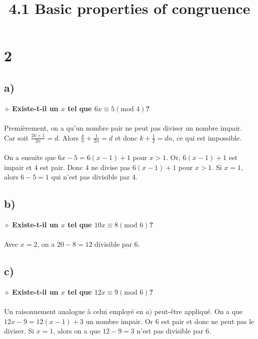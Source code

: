 \documentclass[a4paper,10pt]{article}
\title{4.1 Basic properties of congruence}
\begin{document}
\maketitle

\section*{2}
\subsection*{a)}
$\diamond$ \textbf{Existe-t-il un $x$ tel que $6x \equiv 5(\text{mod } 4)$?}
\\
\\
Premièrement, on a qu'un nombre pair ne peut pas diviser un nombre impair. Car soit $\frac{2k+1}{2n} = d$. Alors $\frac{k}{n} + \frac{1}{2n} = d$ et donc $k + \frac{1}{2} = dn$, ce qui est impossible.
\\
\\
On a ensuite que $6x - 5 = 6(x-1) + 1$ pour $x > 1$. Or, $6(x-1) + 1$ est impair et 4 est pair. Donc 4 ne divise pas $6(x-1)+ 1$ pour $x > 1$. Si $x = 1$, alors $6-5 = 1$ qui n'est pas divisible par 4.

\subsection*{b)}
$\diamond$ \textbf{Existe-t-il un $x$ tel que $10x \equiv 8 (\text{mod }6)$?}
\\
\\
Avec $x = 2$, on a $20 - 8 = 12$ divisible par 6.

\subsection*{c)}
$\diamond$ \textbf{Existe-t-il un $x$ tel que $12x \equiv 9 (\text{mod }6)$?}
\\
\\
Un raisonnement analogue à celui employé en $a)$ peut-être appliqué. On a que $12x - 9 = 12(x-1) + 3$ un nombre impair. Or 6 est pair et donc ne peut pas le diviser. Si $x = 1$, alors on a que $12-9 = 3$ n'est pas divisible par 6.
\end{document}
